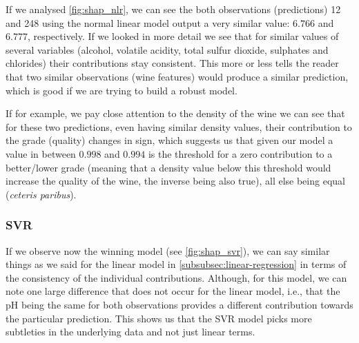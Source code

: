 \documentclass[11pt]{article}
\begin{document}
If we analysed \cref{fig:shap_nlr}, we can see the both observations (predictions) 12 and 248 using the normal
linear model output a very similar value: $6.766$ and $6.777$, respectively.
If we looked in more detail we see that for similar values of several variables (alcohol, volatile acidity,
total sulfur dioxide, sulphates and chlorides) their contributions stay consistent.
This more or less tells the reader that two similar observations (wine features) would produce a similar
prediction, which is good if we are trying to build a robust model.

If for example, we pay close attention to the density of the wine we can see that for these two predictions, even having
similar density values, their contribution to the grade (quality) changes in sign, which suggests us that given our model
a value in between $0.998$ and $0.994$ is the threshold for a zero contribution to a better/lower grade (meaning that
a density value below this threshold would increase the quality of the wine, the inverse being also true), all else being
equal (\emph{ceteris paribus}).

\subsubsection{SVR}

If we observe now the winning model (see \cref{fig:shap_svr}), we can say similar things as we said for the linear model in
\cref{subsubsec:linear-regression} in terms of the consistency of the individual contributions.
Although, for this model, we can note one large difference that does not occur for the linear model, i.e., that
the pH being the same for both observations provides a different contribution towards the particular prediction.
This shows us that the SVR model picks more subtleties in the underlying data and not just linear terms.
\end{document}
